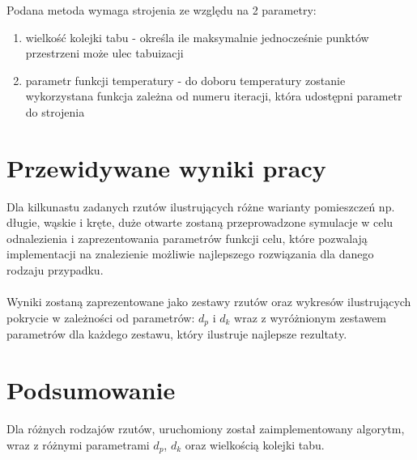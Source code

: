 \documentclass[12pt,a4paper]{article}
\begin{document}
Podana metoda wymaga strojenia ze względu na 2 parametry:
\begin{enumerate}
  \item wielkość kolejki tabu - określa ile maksymalnie jednocześnie punktów
      przestrzeni może ulec tabuizacji
  \item parametr funkcji temperatury - do doboru temperatury zostanie
      wykorzystana funkcja zależna od numeru iteracji,
      która udostępni parametr do strojenia
\end{enumerate}

\section{Przewidywane wyniki pracy}
Dla kilkunastu zadanych rzutów ilustrujących różne warianty pomieszczeń
np. długie, wąskie i kręte, duże otwarte zostaną przeprowadzone symulacje
w celu odnalezienia i zaprezentowania parametrów funkcji celu,
które pozwalają implementacji na znalezienie możliwie
najlepszego rozwiązania dla danego rodzaju przypadku. \\ \\
Wyniki zostaną zaprezentowane jako zestawy rzutów oraz wykresów
ilustrujących pokrycie w zależności od parametrów: $d_p$ i $d_k$
wraz z wyróżnionym zestawem parametrów dla każdego zestawu,
który ilustruje najlepsze rezultaty.

\newpage
\section{Podsumowanie}
Dla różnych rodzajów rzutów, uruchomiony został zaimplementowany algorytm,
wraz z różnymi parametrami $d_p$, $d_k$ oraz wielkością kolejki tabu.
\end{document}
